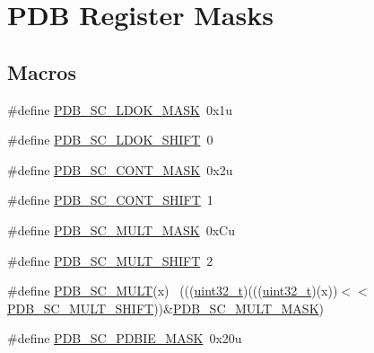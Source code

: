 \hypertarget{group___p_d_b___register___masks}{}\section{P\+DB Register Masks}
\label{group___p_d_b___register___masks}
\subsection*{Macros}
\begin{DoxyCompactItemize}
\item 
\#define \hyperlink{group___p_d_b___register___masks_gabe6a0c2a0e00e0d01b3b94ca8cd90728}{P\+D\+B\+\_\+\+S\+C\+\_\+\+L\+D\+O\+K\+\_\+\+M\+A\+SK}~0x1u
\item 
\#define \hyperlink{group___p_d_b___register___masks_ga8766bd357685d2ec463f51e0b08c6080}{P\+D\+B\+\_\+\+S\+C\+\_\+\+L\+D\+O\+K\+\_\+\+S\+H\+I\+FT}~0
\item 
\#define \hyperlink{group___p_d_b___register___masks_gaa723ee73c65ba7680ef3c9de87b8a635}{P\+D\+B\+\_\+\+S\+C\+\_\+\+C\+O\+N\+T\+\_\+\+M\+A\+SK}~0x2u
\item 
\#define \hyperlink{group___p_d_b___register___masks_ga49a81fd7584f9957362d71ac5f4d12bb}{P\+D\+B\+\_\+\+S\+C\+\_\+\+C\+O\+N\+T\+\_\+\+S\+H\+I\+FT}~1
\item 
\#define \hyperlink{group___p_d_b___register___masks_ga86e3ec0c9f5ec6d0bbc1ebcf20774b38}{P\+D\+B\+\_\+\+S\+C\+\_\+\+M\+U\+L\+T\+\_\+\+M\+A\+SK}~0x\+Cu
\item 
\#define \hyperlink{group___p_d_b___register___masks_gaaf1dfea7eddb56850efd85b75d659ef8}{P\+D\+B\+\_\+\+S\+C\+\_\+\+M\+U\+L\+T\+\_\+\+S\+H\+I\+FT}~2
\item 
\#define \hyperlink{group___p_d_b___register___masks_ga5fe2838ee5a8eae1d02b3fc548b8a6a3}{P\+D\+B\+\_\+\+S\+C\+\_\+\+M\+U\+LT}(x)                                                  ~(((\hyperlink{_p_e___types_8h_a33594304e786b158f3fb30289278f5af}{uint32\+\_\+t})(((\hyperlink{_p_e___types_8h_a33594304e786b158f3fb30289278f5af}{uint32\+\_\+t})(x))$<$$<$\hyperlink{group___p_d_b___register___masks_gaaf1dfea7eddb56850efd85b75d659ef8}{P\+D\+B\+\_\+\+S\+C\+\_\+\+M\+U\+L\+T\+\_\+\+S\+H\+I\+FT}))\&\hyperlink{group___p_d_b___register___masks_ga86e3ec0c9f5ec6d0bbc1ebcf20774b38}{P\+D\+B\+\_\+\+S\+C\+\_\+\+M\+U\+L\+T\+\_\+\+M\+A\+SK})
\item 
\#define \hyperlink{group___p_d_b___register___masks_ga153222e454507310871a217b8ede92fd}{P\+D\+B\+\_\+\+S\+C\+\_\+\+P\+D\+B\+I\+E\+\_\+\+M\+A\+SK}~0x20u
$$
\end{DoxyCompactItemize}
